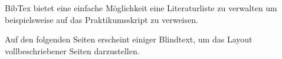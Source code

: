 \documentclass[a4paper]{article}
\begin{document}
BibTex bietet eine einfache Möglichkeit eine Literaturliste zu verwalten um
beispielsweise auf das Praktikumsskript \citep{IPrak2016} zu verweisen.

Auf den folgenden Seiten erscheint einiger Blindtext, um das Layout
vollbeschriebener Seiten darzustellen.
\blinddocument
\blindmathpaper


\end{document}
